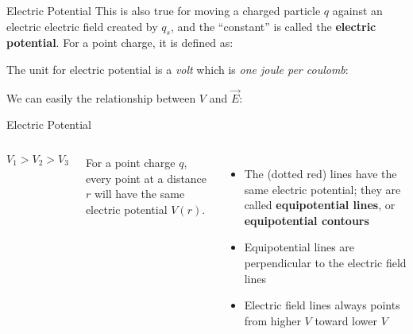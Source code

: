 \documentclass[12pt,aspectratio=169]{beamer}
\begin{document}
\begin{frame}{Electric Potential}
  This is also true for moving a charged particle $q$ against an electric
  electric field created by $q_s$, and the ``constant'' is called the
  \textbf{electric potential}. For a point charge, it is defined as:


  The unit for electric potential is a \emph{volt} which is
  \emph{one joule per coulomb}:


  \vspace{-.2in}We can easily the relationship between $V$ and $\vec E$:
  
\end{frame}



\begin{frame}{Electric Potential}
  \begin{columns}
    \centering
 
    \vspace{-.4in}
    \begin{displaymath}
      V_1>V_2>V_3
    \end{displaymath}
    
    For a point charge $q$, every point at a distance $r$ will have the same
    electric potential $V(r)$.
    \begin{itemize}
    \item The (dotted red) lines have the same electric potential; they are
      called \textbf{equipotential lines}, or \textbf{equipotential contours}
    \item Equipotential lines are perpendicular to the electric field lines
    \item Electric field lines always points from higher $V$ toward lower $V$
    \end{itemize}
  \end{columns}
\end{frame}
\end{document}
